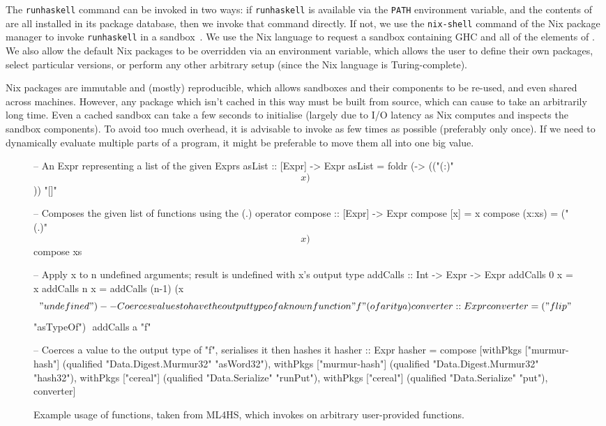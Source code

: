 The \texttt{runhaskell} command can be invoked in two ways: if
\texttt{runhaskell} is available via the \texttt{PATH} environment variable, and
the contents of  are all installed in its package database, then we
invoke that command directly. If not, we use the \texttt{nix-shell} command of
the Nix package manager to invoke \texttt{runhaskell} in a sandbox~\cite{TODO}.
We use the Nix language to request a sandbox containing GHC and all of the
elements of . We also allow the default Nix packages to be overridden
via an environment variable, which allows the user to define their own packages,
select particular versions, or perform any other arbitrary setup (since the Nix
language is Turing-complete).

Nix packages are immutable and (mostly) reproducible, which allows sandboxes and
their components to be re-used, and even shared across machines. However, any
package which isn't cached in this way must be built from source, which can
cause  to take an arbitrarily long time. Even a cached sandbox can take
a few seconds to initialise (largely due to I/O latency as Nix computes and
inspects the sandbox components). To avoid too much overhead, it is advisable to
invoke  as few times as possible (preferably only once). If we need to
dynamically evaluate multiple parts of a program, it might be preferable to move
them all into one big  value.

\begin{figure}
  \begin{haskell}
-- An Expr representing a list of the given Exprs
asList :: [Expr] -> Expr
asList = foldr (\x -> (("(:)" $$ x) $$)) "[]"

-- Composes the given list of functions using the (.) operator
compose :: [Expr] -> Expr
compose [x]    = x
compose (x:xs) = ("(.)" $$ x) $$ compose xs

-- Apply x to n undefined arguments; result is undefined with x's output type
addCalls :: Int -> Expr -> Expr
addCalls 0 x = x
addCalls n x = addCalls (n-1) (x $$ "undefined")

-- Coerces values to have the output type of a known function "f" (of arity a)
converter :: Expr
converter = ("flip" $$ "asTypeOf") $$ addCalls a "f"

-- Coerces a value to the output type of "f", serialises it then hashes it
hasher :: Expr
hasher = compose [withPkgs ["murmur-hash"]
                    (qualified "Data.Digest.Murmur32" "asWord32"),
                  withPkgs ["murmur-hash"]
                    (qualified "Data.Digest.Murmur32" "hash32"),
                  withPkgs ["cereal"]
                    (qualified "Data.Serialize" "runPut"),
                  withPkgs ["cereal"]
                    (qualified "Data.Serialize" "put"),
                  converter]
  \end{haskell}
  \caption{Example usage of \nixeval functions, taken from \textsc{ML4HS}, which
    invokes \qspec on arbitrary user-provided functions.}
  \label{fig:nix-eval}
\end{figure}

